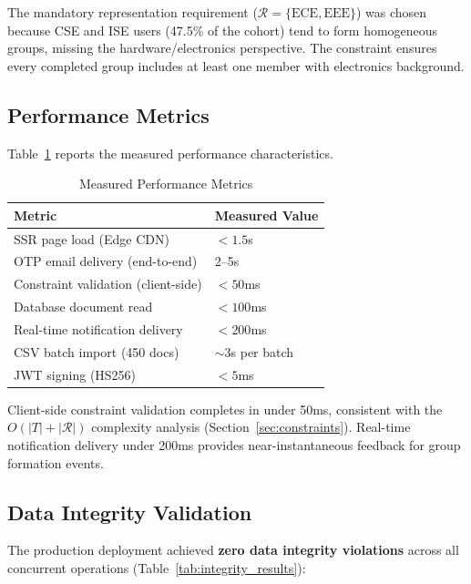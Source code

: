 \documentclass[11pt,a4paper]{article}
\theoremstyle{plain}
\theoremstyle{definition}
\begin{document}
The mandatory representation requirement ($\mathcal{R} = \{\text{ECE}, \text{EEE}\}$) was chosen because CSE and ISE users (47.5\% of the cohort) tend to form homogeneous groups, missing the hardware/electronics perspective. The constraint ensures every completed group includes at least one member with electronics background.

\subsection{Performance Metrics}

Table~\ref{tab:performance} reports the measured performance characteristics.

\begin{table}[htbp]
\centering
\caption{Measured Performance Metrics}
\label{tab:performance}
\small
\renewcommand{\arraystretch}{1.15}
\begin{tabular}{@{}ll@{}}
\toprule
\textbf{Metric} & \textbf{Measured Value} \\
\midrule
SSR page load (Edge CDN) & $< 1.5$s \\
OTP email delivery (end-to-end) & 2--5s \\
Constraint validation (client-side) & $< 50$ms \\
Database document read & $< 100$ms \\
Real-time notification delivery & $< 200$ms \\
CSV batch import (450 docs) & $\sim$3s per batch \\
JWT signing (HS256) & $< 5$ms \\
\bottomrule
\end{tabular}
\end{table}

Client-side constraint validation completes in under 50ms, consistent with the $O(|T| + |\mathcal{R}|)$ complexity analysis (Section~\ref{sec:constraints}). Real-time notification delivery under 200ms provides near-instantaneous feedback for group formation events.

\subsection{Data Integrity Validation}

The production deployment achieved \textbf{zero data integrity violations} across all concurrent operations (Table~\ref{tab:integrity_results}):
\end{document}
